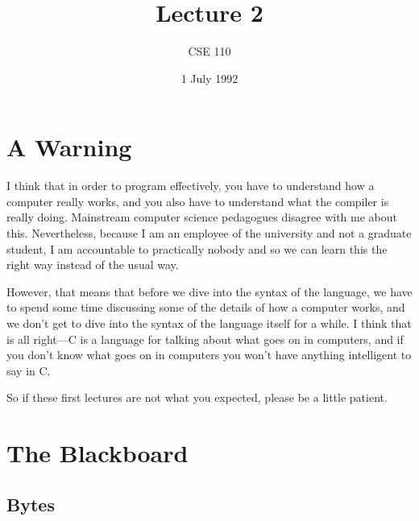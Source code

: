 


\def\brac#1{$<$#1$>$}
\def\Int{{\tt int}}
\def\int{\brac{\Int}}
\def\int{\brac{\Int}}
\def\Shortint{{\tt short~int}}
\def\shortint{\brac{\Shortint}}
\def\Longint{{\tt long~int}}
\def\longint{\brac{\Longint}}
\def\Float{{\tt float}}
\def\float{\brac{\Float}}
\def\Double{{\tt double}}
\def\double{\brac{\Double}}
\def\Char{{\tt char}}
\def\char{\brac{\Char}}
\def\Void{{\tt void}}
\def\void{\brac{\Void}}

\def\p2#1{\brac{pointer~to #1}}

\parskip 8pt

\title{Lecture 2}
\author{CSE 110}
\date{1 July 1992}



\maketitle

\section{A Warning}

    I think that in order to program effectively, you have to understand
how a computer really works, and you also have to understand what the
compiler is really doing.  Mainstream computer science pedagogues
disagree with me about this.  Nevertheless, because I am an employee of
the university and not a graduate student, I am accountable to
practically nobody and so we can learn this the right way instead of the
usual way.

    However, that means that before we dive into the syntax of the
language, we have to spend some time discussing some of the details of
how a computer works, and we don't get to dive into the syntax of the
language itself for a while.  I think that is all right---C is a
language for talking about what goes on in computers, and if you don't
know what goes on in computers you won't have anything intelligent to
say in C.

    So if these first lectures are not what you expected, please be a
little patient.

\section{The Blackboard}

\subsection{Bytes}

